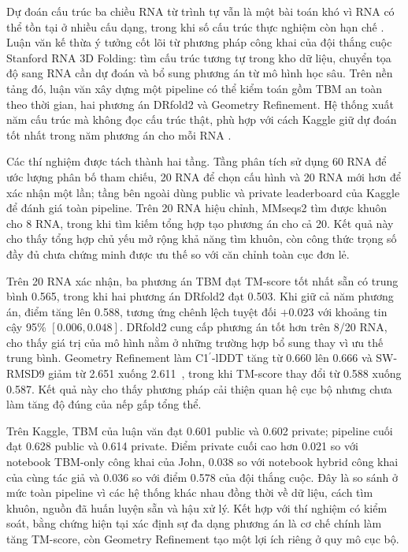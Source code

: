 \documentclass[12pt,a4paper,oneside]{report}
\newcommand{\cprime}{C1$^{\prime}$}
\newcommand{\angstrom}{\text{\AA}}
\begin{document}
Dự đoán cấu trúc ba chiều RNA từ trình tự vẫn là một bài toán khó vì RNA có thể tồn tại
ở nhiều cấu dạng, trong khi số cấu trúc thực nghiệm còn hạn chế
\cite{zhang_experimental_review,rna_progress_review,state_of_rnart}. Luận văn kế thừa
ý tưởng cốt lõi từ phương pháp công khai của đội thắng cuộc Stanford RNA 3D Folding:
tìm cấu trúc tương tự trong kho dữ liệu, chuyển tọa độ sang RNA cần dự đoán và bổ sung
phương án từ mô hình học sâu. Trên nền tảng đó, luận văn xây dựng một pipeline có thể
kiểm toán gồm TBM an toàn theo thời gian, hai phương án DRfold2 và Geometry Refinement.
Hệ thống xuất năm cấu trúc mà không đọc cấu trúc thật, phù hợp với cách Kaggle giữ dự
đoán tốt nhất trong năm phương án cho mỗi RNA
\cite{competition_paper,kaggle_competition,kaggle_top1}.

Các thí nghiệm được tách thành hai tầng. Tầng phân tích sử dụng 60 RNA để ước lượng phân bố tham chiếu,
20 RNA để chọn cấu hình và 20 RNA mới hơn để xác nhận một lần; tầng bên ngoài dùng public
và private leaderboard của Kaggle để đánh giá toàn pipeline. Trên 20 RNA hiệu chỉnh,
MMseqs2 tìm được khuôn cho 8 RNA, trong khi tìm kiếm tổng hợp tạo phương án cho cả 20.
Kết quả này cho thấy tổng hợp chủ yếu mở rộng khả năng tìm khuôn, còn công thức trọng số
đầy đủ chưa chứng minh được ưu thế so với căn chỉnh toàn cục đơn lẻ.

Trên 20 RNA xác nhận, ba phương án TBM đạt TM-score tốt nhất sẵn có trung bình 0.565,
trong khi hai phương án DRfold2 đạt 0.503. Khi giữ cả năm phương án, điểm tăng lên 0.588,
tương ứng chênh lệch tuyệt đối $+0.023$ với khoảng tin cậy 95\% $[0.006,0.048]$.
DRfold2 cung cấp phương án tốt hơn trên 8/20 RNA, cho thấy giá trị của mô hình nằm ở
những trường hợp bổ sung thay vì ưu thế trung bình. Geometry Refinement làm
\cprime{}-lDDT tăng từ 0.660 lên 0.666 và SW-RMSD9 giảm từ 2.651 xuống
2.611~\angstrom{}, trong khi TM-score thay đổi từ 0.588 xuống 0.587. Kết quả này cho thấy
phương pháp cải thiện quan hệ cục bộ nhưng chưa làm tăng độ đúng của nếp gấp tổng thể.

Trên Kaggle, TBM của luận văn đạt 0.601 public và 0.602 private; pipeline cuối đạt 0.628
public và 0.614 private. Điểm private cuối cao hơn 0.021 so với notebook TBM-only công
khai của John, 0.038 so với notebook hybrid công khai của cùng tác giả và 0.036 so với
điểm 0.578 của đội thắng cuộc. Đây là so sánh ở mức toàn pipeline vì các hệ thống khác
nhau đồng thời về dữ liệu, cách tìm khuôn, nguồn đã huấn luyện sẵn và hậu xử lý. Kết hợp với
thí nghiệm có kiểm soát, bằng chứng hiện tại xác định sự đa dạng phương án là cơ chế
chính làm tăng TM-score, còn Geometry Refinement tạo một lợi ích riêng ở quy mô cục bộ.
\end{document}
